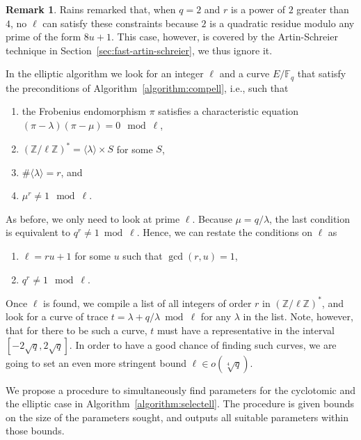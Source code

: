 \documentclass[12pt]{article}
\theoremstyle{plain}
\theoremstyle{definition}
\newtheorem*{remark}{Remark}
\def\Z{\ensuremath{\mathbb{Z}}}
\def\F{\ensuremath{\mathbb{F}}}
\newcounter{algorithm}
\begin{document}
\begin{remark}
  Rains remarked that, when $q=2$ and $r$ is a power of $2$ greater
  than $4$, no $\ell$ can satisfy these constraints because $2$ is a
  quadratic residue modulo any prime of the form $8u+1$. This case,
  however, is covered by the Artin-Schreier technique in
  Section~\ref{sec:fast-artin-schreier}, we thus ignore it.
\end{remark}

In the elliptic algorithm we look for an integer $\ell$ and a curve
$E/\F_q$ that satisfy the preconditions of
Algorithm~\ref{algorithm:compell}, i.e., such that 
\begin{enumerate}
\item the Frobenius endomorphism $\pi$ satisfies a characteristic
  equation $(\pi-\lambda)(\pi-\mu) = 0 \mod \ell$,
\item $(\Z/\ell\Z)^\ast = \langle\lambda\rangle\times S$ for some $S$,
\item $\#\langle\lambda\rangle=r$, and
\item $\mu^r\ne1\mod\ell$.
\end{enumerate}

As before, we only need to look at prime $\ell$. Because
$\mu=q/\lambda$, the last condition is equivalent to
$q^r\ne1\bmod\ell$. Hence, we can restate the conditions on $\ell$ as
\begin{enumerate}
\item $\ell = ru+1$ for some $u$ such that $\gcd(r,u)=1$,
\item $q^r\ne1\mod\ell$.
\end{enumerate}
Once $\ell$ is found, we compile a list of all integers of order $r$
in $(\Z/\ell\Z)^\ast$, and look for a curve of trace
$t=\lambda+q/\lambda\bmod\ell$ for any $\lambda$ in the list. Note,
however, that for there to be such a curve, $t$ must have a
representative in the interval $[-2\sqrt{q},2\sqrt{q}]$. In order to
have a good chance of finding such curves, we are going to set an even
more stringent bound $\ell\in o(\sqrt[4]{q})$.

We propose a procedure to simultaneously find parameters for the
cyclotomic and the elliptic case in
Algorithm~\ref{algorithm:selectell}. The procedure is given bounds on
the size of the parameters sought, and outputs all suitable parameters
within those bounds.
\end{document}

